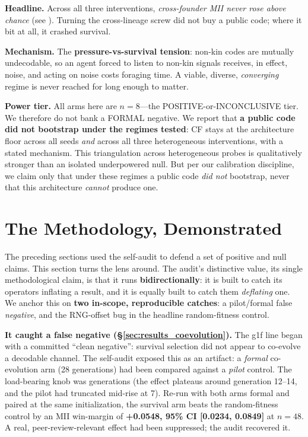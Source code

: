 \documentclass[12pt,letterpaper]{article}
\begin{document}
\textbf{Headline.} Across all three interventions, \emph{cross-founder MII never rose above
chance} (see ). Turning the cross-lineage screw did not buy a public
code; where it bit at all, it crashed survival.

\textbf{Mechanism.} The \textbf{pressure-vs-survival tension}: non-kin codes are mutually
undecodable, so an agent forced to listen to non-kin signals receives, in effect, noise, and
acting on noise costs foraging time. A viable, diverse, \emph{converging} regime is never
reached for long enough to matter.

\textbf{Power tier.} All arms here are $n{=}8$---the POSITIVE-or-INCONCLUSIVE tier. We
therefore do not bank a FORMAL negative. We report that \textbf{a public code did not
bootstrap under the regimes tested}: CF stays at the architecture floor across all seeds
\emph{and} across all three heterogeneous interventions, with a stated mechanism. This
triangulation across heterogeneous probes is qualitatively stronger than an isolated
underpowered null. But per our calibration discipline, we claim only that under these
regimes a public code \emph{did not} bootstrap, never that this architecture \emph{cannot}
produce one.

\section{The Methodology, Demonstrated}
\label{sec:method_demo}

The preceding sections used the self-audit to defend a set of positive and null claims. This
section turns the lens around. The audit's distinctive value, its single methodological
claim, is that it runs \textbf{bidirectionally}: it is built to catch its operators
inflating a result, and it is equally built to catch them \emph{deflating} one. We anchor
this on \textbf{two in-scope, reproducible catches}: a pilot/formal false \emph{negative},
and the RNG-offset bug in the headline random-fitness control.

\textbf{It caught a false negative (\S\ref{sec:results_coevolution}).} The g1f line began
with a committed ``clean negative'': survival selection did not appear to co-evolve a
decodable channel. The self-audit exposed this as an artifact: a \emph{formal} co-evolution
arm (28 generations) had been compared against a \emph{pilot} control. The load-bearing knob
was generations (the effect plateaus around generation 12--14, and the pilot had truncated
mid-rise at 7). Re-run with both arms formal and paired at the same initialization, the
survival arm beats the random-fitness control by an MII win-margin of
\textbf{+0.0548, 95\% CI [0.0234, 0.0849]} at $n{=}48$. A real, peer-review-relevant effect
had been suppressed; the audit recovered it.
\end{document}
